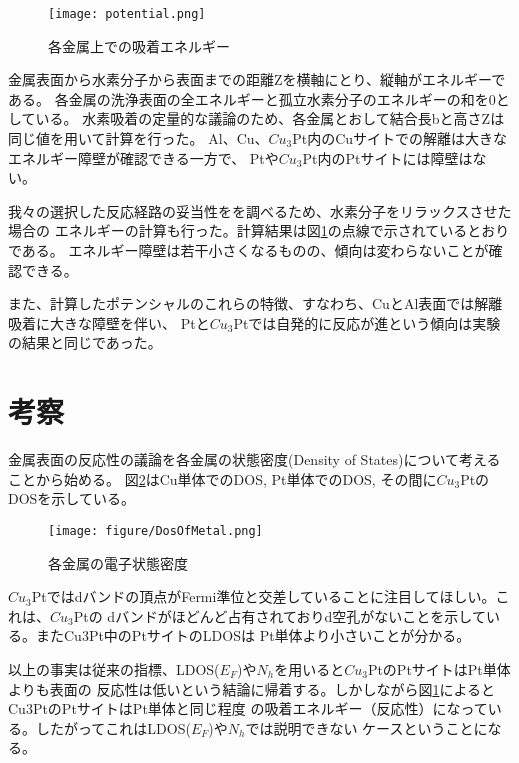 \documentclass[12pt]{ltjsarticle}
\begin{document}
\begin{figure}[hbtp]
    \begin{center}
     \texttt{[image: potential.png]}
    \end{center}
    \caption{各金属上での吸着エネルギー}
    \label{fig:potential}
\end{figure}

金属表面から水素分子から表面までの距離Zを横軸にとり、縦軸がエネルギーである。
各金属の洗浄表面の全エネルギーと孤立水素分子のエネルギーの和を0としている。
水素吸着の定量的な議論のため、各金属とおして結合長bと高さZは同じ値を用いて計算を行った。
Al、Cu、$Cu_3$Pt内のCuサイトでの解離は大きなエネルギー障壁が確認できる一方で、
Ptや$Cu_3$Pt内のPtサイトには障壁はない。

我々の選択した反応経路の妥当性をを調べるため、水素分子をリラックスさせた場合の
エネルギーの計算も行った。計算結果は図\ref{fig:potential}の点線で示されているとおりである。
エネルギー障壁は若干小さくなるものの、傾向は変わらないことが確認できる。

また、計算したポテンシャルのこれらの特徴、すなわち、CuとAl表面では解離吸着に大きな障壁を伴い、
Ptと$Cu_3$Ptでは自発的に反応が進という傾向は実験の結果と同じであった。

\section{考察}

金属表面の反応性の議論を各金属の状態密度(Density of States)について考えることから始める。
図\ref{fig:dosmetal}はCu単体でのDOS, Pt単体でのDOS, その間に$Cu_3$PtのDOSを示している。

\begin{figure}[hbtp]
    \begin{center}
     \texttt{[image: figure/DosOfMetal.png]}
    \end{center}
    \caption{各金属の電子状態密度}
    \label{fig:dosmetal}
\end{figure}

$Cu_3$Ptではdバンドの頂点がFermi準位と交差していることに注目してほしい。これは、$Cu_3$Ptの
dバンドがほどんど占有されておりd空孔がないことを示している。またCu3Pt中のPtサイトのLDOSは
Pt単体より小さいことが分かる。

以上の事実は従来の指標、LDOS($E_F$)や$N_h$を用いると$Cu_3$PtのPtサイトはPt単体よりも表面の
反応性は低いという結論に帰着する。しかしながら図\ref{fig:potential}によるとCu3PtのPtサイトはPt単体と同じ程度
の吸着エネルギー（反応性）になっている。したがってこれはLDOS($E_F$)や$N_h$では説明できない
ケースということになる。
\end{document}
